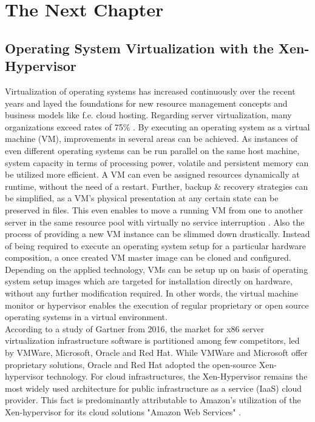 \chapter{The Next Chapter}
\label{cha:2}

\section{Operating System Virtualization with the Xen-Hypervisor}

Virtualization of operating systems has increased continuously over the recent years and layed the foundations for new resource management concepts and business models like f.e. cloud hosting. Regarding server virtualization, many organizations exceed rates of 75\% \cite{gartnervmmarket}. By executing an operating system as a virtual machine (VM), improvements in several areas can be achieved. As instances of even different operating systems can be run parallel on the same host machine, system capacity in terms of processing power, volatile and persistent memory can be utilized more efficient. A VM can even be assigned resources dynamically at runtime, without the need of a restart. Further, backup \& recovery strategies can be simplified, as a VM's physical presentation at any certain state can be preserved in files. This even enables to move a running VM from one to another server in the same resource pool with virtually no service interruption \cite{migratevms}. Also the process of providing a new VM instance can be slimmed down drastically. Instead of being required to execute an operating system setup for a particular hardware composition, a once created VM master image can be cloned and configured. Depending on the applied technology, VMs can be setup up on basis of operating system setup images which are targeted for installation directly on hardware, without any further modification required. In other words, the virtual machine monitor or hypervisor enables the execution of regular proprietary or open source operating systems in a virtual environment. \\
According to a study of Gartner from 2016, the market for x86 server virtualization infrastructure software is partitioned among few competitors, led by VMWare, Microsoft, Oracle and Red Hat. While VMWare and Microsoft offer proprietary solutions, Oracle and Red Hat adopted the open-source Xen-hypervisor technology. For cloud infrastructures, the Xen-Hypervisor remains the most widely used architecture for public infrastructure as a service (IaaS) cloud provider. This fact is predominantly attributable to Amazon's utilization of the Xen-hypervisor for its cloud solutions "Amazon Web Services" \cite{bittman2016magic}.


